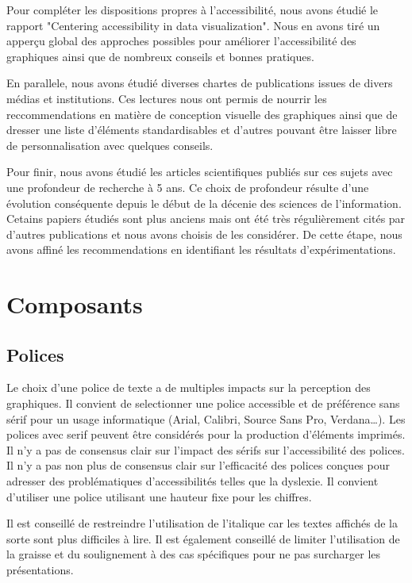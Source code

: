 \documentclass[a4paper,12pt]{article}
\begin{document}
\begin{multicols}{2}
Pour compléter les dispositions propres à l'accessibilité, nous avons étudié le rapport "Centering accessibility in data visualization". \autocite{schwabishCenteringAccessibilityData2022} Nous en avons tiré un apperçu global des approches possibles pour améliorer l'accessibilité des graphiques ainsi que de nombreux conseils et bonnes pratiques.

En parallele, nous avons étudié diverses chartes de publications issues de divers médias et institutions. Ces lectures nous ont permis de nourrir les reccommendations en matière de conception visuelle des graphiques ainsi que de dresser une liste d'éléments standardisables et d'autres pouvant être laisser libre de personnalisation avec quelques conseils.

Pour finir, nous avons étudié les articles scientifiques publiés sur ces sujets avec une profondeur de recherche à 5 ans. Ce choix de profondeur résulte d'une évolution conséquente depuis le début de la décenie des sciences de l'information. Cetains papiers étudiés sont plus anciens mais ont été très régulièrement cités par d'autres publications et nous avons choisis de les considérer. De cette étape, nous avons affiné les recommendations en identifiant les résultats d'expérimentations.
\section*{Composants}
\label{sec:org243f0ca}
\subsection*{Polices}
\label{sec:org6b994e4}
Le choix d'une police de texte a de multiples impacts sur la perception des graphiques. Il convient de selectionner une police accessible et de préférence sans sérif pour un usage informatique (Arial, Calibri, Source Sans Pro, Verdana\ldots{}). \autocite{andreaskrauseBestPracticesData2024} Les polices avec serif peuvent être considérés pour la production d'éléments imprimés. Il n'y a pas de consensus clair sur l'impact des sérifs sur l'accessibilité des polices. \autocite{stephenfewTableDesign2012} Il n'y a pas non plus de consensus clair sur l'efficacité des polices conçues pour adresser des problématiques d'accessibilités telles que la dyslexie. Il convient d'utiliser une police utilisant une hauteur fixe pour les chiffres. \autocite{stephenfewTableDesign2012}

Il est conseillé de restreindre l'utilisation de l'italique car les textes affichés de la sorte sont plus difficiles à lire. Il est également conseillé de limiter l'utilisation de la graisse et du soulignement à des cas spécifiques pour ne pas surcharger les présentations.


\end{multicols}
\end{document}
